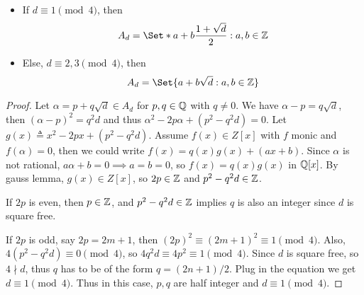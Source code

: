 \begin{theorem} \hfill
  \begin{itemize}
    \item If $d \equiv 1 \pmod{4}$, then
      \[ A_d = \Set*{ a + b \frac{1 + \sqrt{d}}{2} : a, b \in \Zb } \]
    \item Else, $d \equiv 2, 3 \pmod{4}$, then
      \[ A_d = \Set{ a + b \sqrt{d} : a, b \in \Zb } \]
  \end{itemize}
  \begin{proof}
    Let $\alpha = p + q \sqrt{d} \in A_d$ for $p, q \in \mathbb{Q}$ with $q \neq 0$.
    We have $\alpha - p = q \sqrt{d}$, then $(\alpha - p)^2 = q^2 d$
    and thus $\alpha^2 - 2p\alpha + (p^2 - q^2d) = 0$.
    Let $g(x) \triangleq x^2 - 2px + (p^2 - q^2 d)$.
    Assume $f(x) \in Z[x]$ with $f$ monic and $f(\alpha) = 0$, then
    we could write $f(x) = q(x) g(x) + (ax + b)$.
    Since $\alpha$ is not rational, $a\alpha+b = 0 \implies a = b = 0$,
    so $f(x) = q(x) g(x)$ in $\mathbb{Q}[x]$. By gauss lemma,
    $g(x) \in Z[x]$, so $2p \in \mathbb{Z}$ and $p^2 - q^2 d \in \mathbb{Z}$.

    If $2p$ is even, then $p \in \mathbb{Z}$, and $p^2 - q^2 d \in \mathbb{Z}$
    implies $q$ is also an integer since $d$ is square free.

    If $2p$ is odd, say $2p = 2m+1$, then $(2p)^2 \equiv (2m+1)^2 \equiv 1 \pmod{4}$.
    Also, $4(p^2 - q^2 d) \equiv 0 \pmod{4}$, so $4q^2d \equiv 4p^2 \equiv 1 \pmod{4}$.
    Since $d$ is square free, so $4 \nmid d$, thus $q$ has to be of the form
    $q = (2n+1)/2$. Plug in the equation we get $d \equiv 1 \pmod{4}$.
    Thus in this case, $p, q$ are half integer and $d \equiv 1 \pmod{4}$.
  \end{proof}
\end{theorem}

